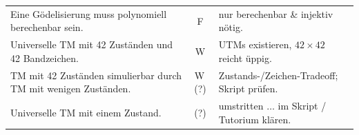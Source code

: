 \begin{mytable}
\begin{tabular}{@{}p{} c p{}@{}}
        Eine Gödelisierung muss polynomiell berechenbar sein.
        & F & nur berechenbar \& injektiv nötig.\\
        Universelle TM mit 42 Zuständen und 42 Bandzeichen.
        & W & UTMs existieren, $42\times42$ reicht üppig.\\
        TM mit 42 Zuständen simulierbar durch TM mit wenigen Zuständen.
        & W\,(?) & Zustands-/Zeichen-Tradeoff;
        Skript prüfen.\\
        Universelle TM mit einem Zustand.
        & (?) & umstritten $\ldots$ im Skript / Tutorium klären.\\
        \hline
    \end{tabular}
\end{mytable}